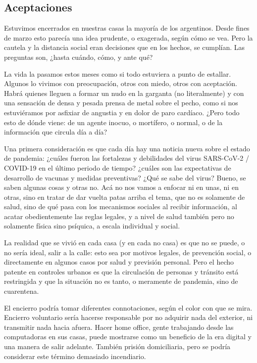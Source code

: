 \subsection{Aceptaciones}

Estuvimos encerrados en nuestras casas la mayoría de los argentinos.
Desde fines de marzo esto parecía una idea prudente, o exagerada, según cómo se vea.
Pero la cautela y la distancia social eran decisiones que en los hechos, se cumplían.
Las preguntas son, ¿hasta cuándo, cómo, y ante qué?

La vida la pasamos estos meses como si todo estuviera a punto de estallar.
Algunos lo vivimos con preocupación, otros con miedo, otros
con aceptación. Habrá quienes lleguen a formar un nudo en la garganta
(no literalmente) y con una sensación de densa y pesada prensa de metal
sobre el pecho, como si nos estuviéramos por asfixiar de angustia y en
dolor de paro cardíaco. ¿Pero todo esto de dónde viene: de un agente
inocuo, o mortífero, o normal, o de la información que circula día a día?

Una primera consideración es que cada día hay una noticia nueva sobre el estado de pandemia:
¿cuáles fueron las fortalezas y debilidades del virus SARS-CoV-2 / COVID-19 en el último periodo de tiempo?
¿cuáles son las expectativas de desarrollo de vacunas y medidas preventivas?
¿Qué se sabe del virus? Bueno, se saben algunas cosas y otras no. 
Acá no nos vamos a enfocar ni en unas, ni en otras, sino en tratar de dar vuelta patas arriba el tema, que no es solamente de salud, sino de qué pasa con los mecanismos sociales al recibir información,
al acatar obedientemente las reglas legales, 
y a nivel de salud también pero no solamente física sino psíquica, a escala individual y social.

La realidad que se vivió en cada casa (y en cada no casa) es que no se puede, o no sería ideal, salir a la calle:
esto sea por motivos legales, de prevención social, o directamente en algunos casos por salud y previsión personal.
Pero el hecho patente en controles urbanos es que la circulación de personas y tránsito está restringida
y que la situación no es tanto, o meramente de pandemia, sino de cuarentena.

El encierro podría tomar diferentes connotaciones, según el color con que se mira.
Encierro voluntario sería hacerse responsable por no adquirir nada del exterior, ni transmitir nada hacia afuera.
Hacer home office, gente trabajando desde las computadoras en sus casas, puede mostrarse como un beneficio de la era digital y una manera de salir adelante.
También prisión domiciliaria, pero se podría considerar este término demasiado incendiario.

